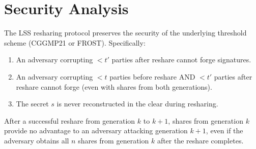 \section{Security Analysis}


\begin{theorem}
The LSS resharing protocol preserves the security of the underlying threshold scheme (CGGMP21 or FROST). Specifically:
\begin{enumerate}[nosep]
  \item An adversary corrupting $< t'$ parties after reshare cannot forge signatures.
  \item An adversary corrupting $< t$ parties before reshare AND $< t'$ parties after reshare cannot forge (even with shares from both generations).
  \item The secret $s$ is never reconstructed in the clear during resharing.
\end{enumerate}
\end{theorem}

\begin{theorem}
After a successful reshare from generation $k$ to $k+1$, shares from generation $k$ provide no advantage to an adversary attacking generation $k+1$, even if the adversary obtains all $n$ shares from generation $k$ after the reshare completes.
\end{theorem}

